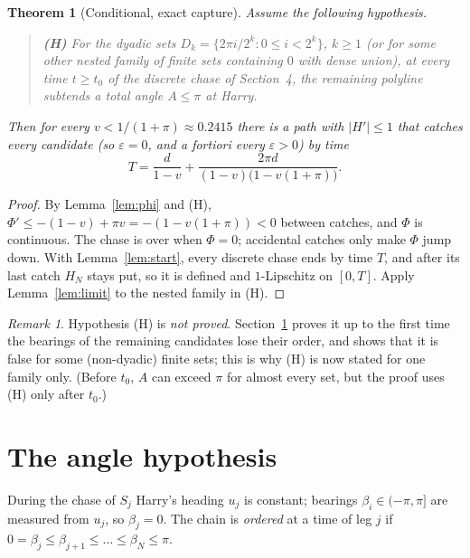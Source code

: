 \documentclass[11pt]{article}
\newtheorem{theorem}{Theorem}
\theoremstyle{remark}\newtheorem{remark}{Remark}
\begin{document}
\begin{theorem}[Conditional, exact capture]\label{thm:B}
Assume the following hypothesis.
\begin{quote}
\textbf{(H)} For the dyadic sets $D_k=\{2\pi i/2^k:0\le i<2^k\}$, $k\ge1$ (or for some other nested family of finite sets
containing $0$ with dense union), at every time $t\ge t_0$ of the discrete chase of Section~4, the remaining polyline subtends
a total angle $A\le\pi$ at Harry.
\end{quote}
Then for every $v<1/(1+\pi)\approx0.2415$ there is a path with $|H'|\le1$ that catches every candidate (so $\varepsilon=0$, and
a fortiori every $\varepsilon>0$) by time
\[
T=\frac{d}{1-v}+\frac{2\pi d}{(1-v)\bigl(1-v(1+\pi)\bigr)} .
\]
\end{theorem}
\begin{proof}
By Lemma~\ref{lem:phi} and (H), $\Phi'\le-(1-v)+\pi v=-(1-v(1+\pi))<0$ between catches, and $\Phi$ is continuous. The chase is
over when $\Phi=0$; accidental catches only make $\Phi$ jump down. With Lemma~\ref{lem:start}, every discrete chase ends by
time $T$, and after its last catch $H_N$ stays put, so it is defined and $1$-Lipschitz on $[0,T]$. Apply
Lemma~\ref{lem:limit} to the nested family in (H).
\end{proof}
\begin{remark}
Hypothesis (H) is \emph{not proved}. Section~\ref{sec:angle} proves it up to the first time the bearings of the remaining
candidates lose their order, and shows that it is false for some (non-dyadic) finite sets; this is why (H) is now stated for one
family only. (Before $t_0$, $A$ can exceed $\pi$ for almost every set, but the proof uses (H) only after $t_0$.)
\end{remark}

\section{The angle hypothesis}\label{sec:angle}
During the chase of $S_j$ Harry's heading $u_j$ is constant; bearings $\beta_i\in(-\pi,\pi]$ are measured from $u_j$, so $\beta_j=0$.
The chain is \emph{ordered} at a time of leg $j$ if $0=\beta_j\le\beta_{j+1}\le\dots\le\beta_N\le\pi$.
\end{document}
